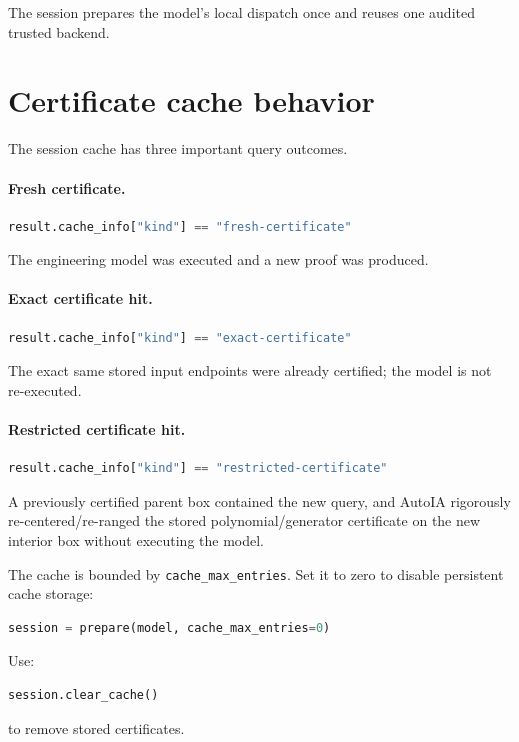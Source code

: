 \documentclass[11pt]{article}
\begin{document}
The session prepares the model's local dispatch once and reuses one audited
trusted backend.

\section{Certificate cache behavior}

The session cache has three important query outcomes.

\paragraph{Fresh certificate.}
\begin{lstlisting}[language=Python]
result.cache_info["kind"] == "fresh-certificate"
\end{lstlisting}
The engineering model was executed and a new proof was produced.

\paragraph{Exact certificate hit.}
\begin{lstlisting}[language=Python]
result.cache_info["kind"] == "exact-certificate"
\end{lstlisting}
The exact same stored input endpoints were already certified; the model is not
re-executed.

\paragraph{Restricted certificate hit.}
\begin{lstlisting}[language=Python]
result.cache_info["kind"] == "restricted-certificate"
\end{lstlisting}
A previously certified parent box contained the new query, and AutoIA rigorously
re-centered/re-ranged the stored polynomial/generator certificate on the new
interior box without executing the model.

The cache is bounded by \texttt{cache\_max\_entries}.  Set it to zero to disable
persistent cache storage:
\begin{lstlisting}[language=Python]
session = prepare(model, cache_max_entries=0)
\end{lstlisting}

Use:
\begin{lstlisting}[language=Python]
session.clear_cache()
\end{lstlisting}
to remove stored certificates.
\end{document}
